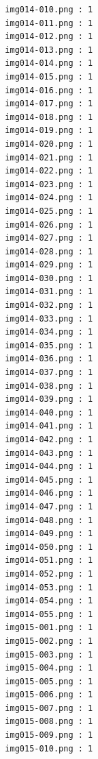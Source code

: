 \documentclass[12pt,a4paper]{article}
\begin{document}
\begin{lstlisting}
                     img014-010.png : 1
                     img014-011.png : 1
                     img014-012.png : 1
                     img014-013.png : 1
                     img014-014.png : 1
                     img014-015.png : 1
                     img014-016.png : 1
                     img014-017.png : 1
                     img014-018.png : 1
                     img014-019.png : 1
                     img014-020.png : 1
                     img014-021.png : 1
                     img014-022.png : 1
                     img014-023.png : 1
                     img014-024.png : 1
                     img014-025.png : 1
                     img014-026.png : 1
                     img014-027.png : 1
                     img014-028.png : 1
                     img014-029.png : 1
                     img014-030.png : 1
                     img014-031.png : 1
                     img014-032.png : 1
                     img014-033.png : 1
                     img014-034.png : 1
                     img014-035.png : 1
                     img014-036.png : 1
                     img014-037.png : 1
                     img014-038.png : 1
                     img014-039.png : 1
                     img014-040.png : 1
                     img014-041.png : 1
                     img014-042.png : 1
                     img014-043.png : 1
                     img014-044.png : 1
                     img014-045.png : 1
                     img014-046.png : 1
                     img014-047.png : 1
                     img014-048.png : 1
                     img014-049.png : 1
                     img014-050.png : 1
                     img014-051.png : 1
                     img014-052.png : 1
                     img014-053.png : 1
                     img014-054.png : 1
                     img014-055.png : 1
                     img015-001.png : 1
                     img015-002.png : 1
                     img015-003.png : 1
                     img015-004.png : 1
                     img015-005.png : 1
                     img015-006.png : 1
                     img015-007.png : 1
                     img015-008.png : 1
                     img015-009.png : 1
                     img015-010.png : 1




\end{lstlisting}
\end{document}

